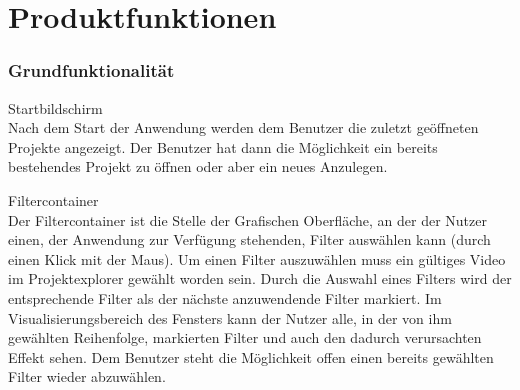\chapter {Produktfunktionen}

\subsection{Grundfunktionalität}
\setcounter{counterKriterien}{0}

 Startbildschirm \\
Nach dem Start der Anwendung werden dem Benutzer die zuletzt geöffneten Projekte angezeigt. Der Benutzer
hat dann die Möglichkeit ein bereits bestehendes Projekt zu öffnen oder aber ein neues Anzulegen.
 
 Filtercontainer \\
Der Filtercontainer ist die Stelle der Grafischen Oberfläche, an der der Nutzer einen, der Anwendung
zur Verfügung stehenden, Filter auswählen kann (durch einen Klick mit der Maus). Um einen Filter auszuwählen
muss ein gültiges Video im Projektexplorer gewählt worden sein. Durch die Auswahl eines Filters wird
der entsprechende Filter als der nächste anzuwendende Filter markiert. Im Visualisierungsbereich des
Fensters kann der Nutzer alle, in der von ihm gewählten Reihenfolge, markierten Filter und auch den
dadurch verursachten Effekt sehen. Dem Benutzer steht die Möglichkeit offen einen bereits gewählten
Filter wieder abzuwählen.

